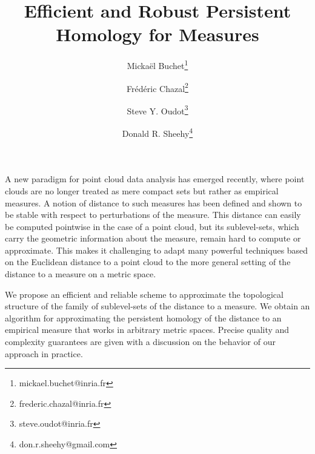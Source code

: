 \documentclass[a4paper]{article}
\title{Efficient and Robust Persistent Homology for Measures}
\author{
      Micka\"{e}l Buchet\footnote{mickael.buchet@inria.fr}
    \and
      Fr\'{e}d\'{e}ric Chazal\footnote{frederic.chazal@inria.fr}
    \and 
      Steve Y. Oudot\footnote{steve.oudot@inria.fr}
    \and
      Donald R. Sheehy\footnote{don.r.sheehy@gmail.com}
  }
\begin{document}
\maketitle

A new paradigm for point cloud data analysis has emerged recently, where point clouds are no longer treated as mere compact sets but rather as empirical measures. 
  A notion of distance to such measures has been defined and shown to be stable with respect to perturbations of the measure. 
  This distance can easily be computed pointwise in the case of a point cloud, but its sublevel-sets, which carry the geometric information about the measure, remain hard to compute or approximate.
  This makes it challenging to adapt many powerful techniques based on the Euclidean distance to a point cloud to the more general setting of the distance to a measure on a metric space.
 
  We propose an efficient and reliable scheme to approximate the topological structure of the family of sublevel-sets of the distance to a measure. 
  We obtain an algorithm for approximating the persistent homology of the distance to an empirical measure that works in arbitrary metric spaces. 
  Precise quality and complexity guarantees are given with a discussion on the behavior of our approach in practice.
 
\end{document}
